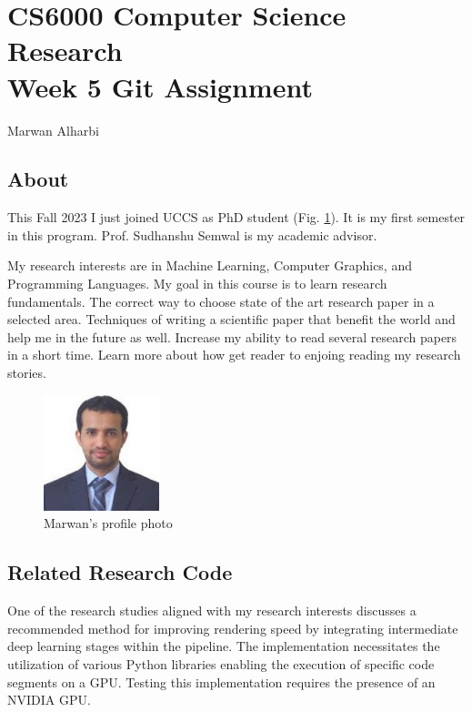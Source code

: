 
\section{CS6000 Computer Science Research\\ {\sc Week 5 Git Assignment}} 

\begin{center}
    Marwan Alharbi
\end{center}


\subsection{About}
This Fall 2023 I just joined UCCS as PhD student (Fig. \ref{img:alharbi:profile}). It is my first semester in 
this program. Prof. Sudhanshu Semwal is my academic advisor.

My research interests are in Machine Learning, Computer Graphics, and Programming 
Languages. My goal in this course is to learn research fundamentals. The correct 
way to choose state of the art research paper in a selected area. Techniques 
of writing a scientific paper that benefit the world and help me in the future as 
well. Increase my ability to read several research papers in a short time. Learn 
more about how get reader to enjoing reading my research stories.

\begin{figure}[h]
    \centerline{\includegraphics[width=0.3\textwidth]{images/alharbi-f23-profile.jpg}}
    \caption{Marwan's profile photo \label{img:alharbi:profile}} 
\end{figure}

\subsection{Related Research Code}
One of the research studies aligned with my research interests discusses a recommended 
method for improving rendering speed by integrating intermediate deep learning stages 
within the pipeline. The implementation necessitates the utilization of various Python
libraries enabling the execution of specific code segments on a GPU. Testing this 
implementation requires the presence of an NVIDIA GPU.

